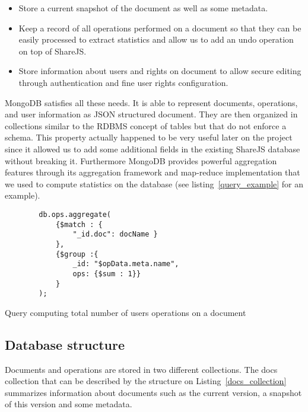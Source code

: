 \documentclass{llncs}
\begin{document}
\begin{itemize}
        \item Store a current snapshot of the document as well as some metadata.
        \item Keep a record of all operations performed on a document so that
            they can be easily processed to extract statistics and allow us to
            add an undo operation on top of ShareJS.
        \item Store information about users and rights on document to allow
            secure editing through authentication and fine user rights
            configuration.
\end{itemize}

MongoDB satisfies all these needs. It is able to represent documents, operations,
and user information as JSON structured document. They are then organized in
collections similar to the RDBMS concept of tables but that do not enforce a schema.
This property actually happened to be very useful later on the project since it
allowed us to add some additional fields in the existing ShareJS database without
breaking it. Furthermore MongoDB provides powerful aggregation features through
its aggregation framework and map-reduce implementation that we used to compute
statistics on the database (see listing~\ref{query_example} for an example).

\begin{listing}
    \begin{verbatim}
        db.ops.aggregate(
            {$match : {
                "_id.doc": docName }
            },
            {$group :{
                _id: "$opData.meta.name",
                ops: {$sum : 1}}
            }
        );
    \end{verbatim}
    \caption{Query computing total number of users operations on a document} 
    \label{query_example}
\end{listing}
\subsection{Database structure}

Documents and operations are stored in two different collections. The docs
collection that can be described by the structure on
Listing~\ref{docs_collection} summarizes information about documents such
as the current version, a snapshot of this version and some metadata.
\end{document}
